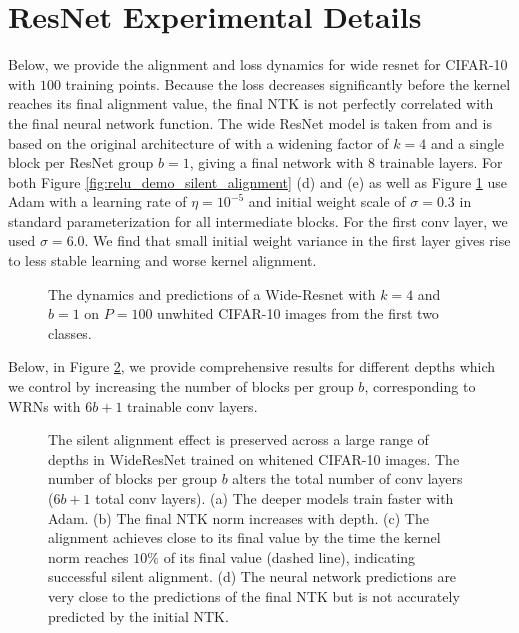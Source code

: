 \documentclass{article} %
\begin{document}
\section{ResNet Experimental Details}\label{app:res_net_experiment}

Below, we provide the alignment and loss dynamics for wide resnet for CIFAR-10 with $100$ training points. Because the loss decreases significantly before the kernel reaches its final alignment value, the final NTK is not perfectly correlated with the final neural network function. The wide ResNet model is taken from \cite{Novak2020Neural} and is based on the original architecture of \cite{zagoruyko2017wide} with  a widening factor of $k=4$ and a single block per ResNet group $b=1$, giving a final network with $8$ trainable layers. For both Figure \ref{fig:relu_demo_silent_alignment} (d) and (e) as well as Figure \ref{fig:unwhitened_relu} use Adam with a learning rate of $\eta = 10^{-5}$ and initial weight scale of $\sigma = 0.3$ in standard parameterization for all intermediate blocks. For the first conv layer, we used $\sigma = 6.0$. We find that small initial weight variance in the first layer gives rise to less stable learning and worse kernel alignment. 
\begin{figure}[h]
    \centering
    \caption{The dynamics and predictions of a Wide-Resnet with $k=4$ and $b=1$ on $P=100$ unwhited CIFAR-10 images from the first two classes.}
    \label{fig:unwhitened_relu}
\end{figure}

Below, in Figure \ref{fig:deeper_res_net}, we provide comprehensive results for different depths which we control by increasing the number of blocks per group $b$, corresponding to WRNs with $6b+1$ trainable conv layers.  
\begin{figure}
    \centering
    \caption{The silent alignment effect is preserved across a large range of depths in WideResNet trained on whitened CIFAR-10 images. The number of blocks per group $b$ alters the total number of conv layers ($6b + 1$ total conv layers). (a) The deeper models train faster with Adam. (b) The final NTK norm increases with depth. (c) The alignment achieves close to its final value by the time the kernel norm reaches $10\%$ of its final value (dashed line), indicating successful silent alignment. (d) The neural network predictions are very close to the predictions of the final NTK but is not accurately predicted by the initial NTK. }
    \label{fig:deeper_res_net}
\end{figure}
\end{document}
